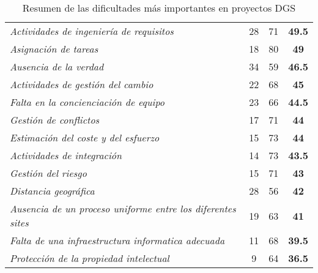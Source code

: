 \begin{table}[htbp]
{\begin{tabular}{lccc|}
        \rowcolor[rgb]{ .949,  .949,  .949} \textit{Actividades de ingeniería de requisitos} & \cellcolor[rgb]{ 1,  1,  1}28 & \cellcolor[rgb]{ 1,  1,  1}71 & \cellcolor[rgb]{ 1,  1,  1}\textbf{49.5} \\
        \rowcolor[rgb]{ .949,  .949,  .949} \textit{Asignación de tareas} & \cellcolor[rgb]{ 1,  1,  1}18 & \cellcolor[rgb]{ 1,  1,  1}80 & \cellcolor[rgb]{ 1,  1,  1}\textbf{49} \\
        \rowcolor[rgb]{ .949,  .949,  .949} \textit{Ausencia de la verdad} & \cellcolor[rgb]{ 1,  1,  1}34 & \cellcolor[rgb]{ 1,  1,  1}59 & \cellcolor[rgb]{ 1,  1,  1}\textbf{46.5} \\
        \rowcolor[rgb]{ .949,  .949,  .949} \textit{Actividades de gestión del cambio} & \cellcolor[rgb]{ 1,  1,  1}22 & \cellcolor[rgb]{ 1,  1,  1}68 & \cellcolor[rgb]{ 1,  1,  1}\textbf{45} \\
        \rowcolor[rgb]{ .949,  .949,  .949} \textit{Falta en la concienciación de equipo} & \cellcolor[rgb]{ 1,  1,  1}23 & \cellcolor[rgb]{ 1,  1,  1}66 & \cellcolor[rgb]{ 1,  1,  1}\textbf{44.5} \\
        \rowcolor[rgb]{ .949,  .949,  .949} \textit{Gestión de conflictos} & \cellcolor[rgb]{ 1,  1,  1}17 & \cellcolor[rgb]{ 1,  1,  1}71 & \cellcolor[rgb]{ 1,  1,  1}\textbf{44} \\
        \rowcolor[rgb]{ .949,  .949,  .949} \textit{Estimación del coste y del esfuerzo} & \cellcolor[rgb]{ 1,  1,  1}15 & \cellcolor[rgb]{ 1,  1,  1}73 & \cellcolor[rgb]{ 1,  1,  1}\textbf{44} \\
        \rowcolor[rgb]{ .949,  .949,  .949} \textit{Actividades de integración} & \cellcolor[rgb]{ 1,  1,  1}14 & \cellcolor[rgb]{ 1,  1,  1}73 & \cellcolor[rgb]{ 1,  1,  1}\textbf{43.5} \\
        \rowcolor[rgb]{ .949,  .949,  .949} \textit{Gestión del riesgo} & \cellcolor[rgb]{ 1,  1,  1}15 & \cellcolor[rgb]{ 1,  1,  1}71 & \cellcolor[rgb]{ 1,  1,  1}\textbf{43} \\
        \rowcolor[rgb]{ .949,  .949,  .949} \textit{Distancia geográfica} & \cellcolor[rgb]{ 1,  1,  1}28 & \cellcolor[rgb]{ 1,  1,  1}56 & \cellcolor[rgb]{ 1,  1,  1}\textbf{42} \\
        \rowcolor[rgb]{ .949,  .949,  .949} \textit{Ausencia de un proceso uniforme entre los diferentes sites} & \cellcolor[rgb]{ 1,  1,  1}19 & \cellcolor[rgb]{ 1,  1,  1}63 & \cellcolor[rgb]{ 1,  1,  1}\textbf{41} \\
        \rowcolor[rgb]{ .949,  .949,  .949} \textit{Falta de una infraestructura informatica adecuada} & \cellcolor[rgb]{ 1,  1,  1}11 & \cellcolor[rgb]{ 1,  1,  1}68 & \cellcolor[rgb]{ 1,  1,  1}\textbf{39.5} \\
        \rowcolor[rgb]{ .949,  .949,  .949} \textit{Protección de la propiedad intelectual} & \cellcolor[rgb]{ 1,  1,  1}9 & \cellcolor[rgb]{ 1,  1,  1}64 & \cellcolor[rgb]{ 1,  1,  1}\textbf{36.5} \\
    \end{tabular}}
  \caption{Resumen de las dificultades más importantes en proyectos DGS}
  \label{tab:DificultadesDGS}
\end{table}

